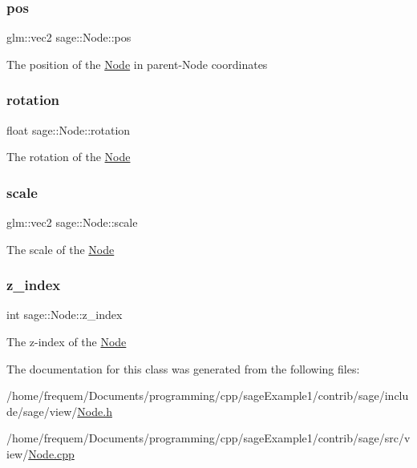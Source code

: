 \subsubsection{\texorpdfstring{pos}{pos}}
{\footnotesize\ttfamily glm\+::vec2 sage\+::\+Node\+::pos\hspace{0.3cm}{\ttfamily [protected]}}

The position of the \mbox{\hyperlink{classsage_1_1Node}{Node}} in parent-\/\+Node coordinates \mbox{\label{classsage_1_1Node_ae83b239ad4c722fee62708977e0560f4}} 
\subsubsection{\texorpdfstring{rotation}{rotation}}
{\footnotesize\ttfamily float sage\+::\+Node\+::rotation\hspace{0.3cm}{\ttfamily [protected]}}

The rotation of the \mbox{\hyperlink{classsage_1_1Node}{Node}} \mbox{\label{classsage_1_1Node_a3014b585d97d3a449e83bc0252db0c50}} 
\subsubsection{\texorpdfstring{scale}{scale}}
{\footnotesize\ttfamily glm\+::vec2 sage\+::\+Node\+::scale\hspace{0.3cm}{\ttfamily [protected]}}

The scale of the \mbox{\hyperlink{classsage_1_1Node}{Node}} \mbox{\label{classsage_1_1Node_ad98383ce93e985bf20e1cd678c622097}} 
\subsubsection{\texorpdfstring{z\_index}{z\_index}}
{\footnotesize\ttfamily int sage\+::\+Node\+::z\+\_\+index\hspace{0.3cm}{\ttfamily [protected]}}

The z-\/index of the \mbox{\hyperlink{classsage_1_1Node}{Node}} 

The documentation for this class was generated from the following files\+:\begin{DoxyCompactItemize}
\item 
/home/frequem/\+Documents/programming/cpp/sage\+Example1/contrib/sage/include/sage/view/\mbox{\hyperlink{Node_8h}{Node.\+h}}\item 
/home/frequem/\+Documents/programming/cpp/sage\+Example1/contrib/sage/src/view/\mbox{\hyperlink{Node_8cpp}{Node.\+cpp}}\end{DoxyCompactItemize}

